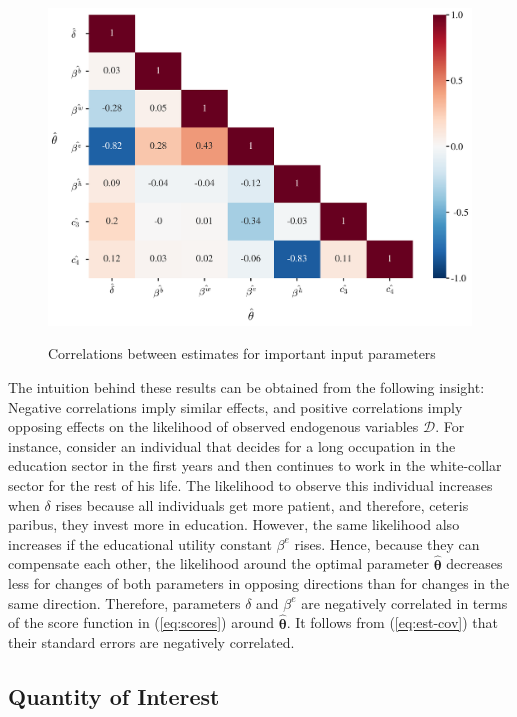 \begin{figure}[H]
	\caption{Correlations between estimates for important input parameters}
	\centering
	\includegraphics[scale=0.45]{../scrypy/figures/heatmap}
	\label{fig:corr}
\end{figure}
\noindent
The intuition behind these results can be obtained from the following insight: Negative correlations imply similar effects, and positive correlations imply opposing effects on the likelihood of observed endogenous variables $\pmb{\mathcal{D}}$. For instance, consider an individual that decides for a long occupation in the education sector in the first years and then continues to work in the white-collar sector for the rest of his life. The likelihood to observe this individual increases when $\delta$ rises because all individuals get more patient, and therefore, ceteris paribus, they invest more in education. However, the same likelihood also increases if the educational utility constant $\beta^e$ rises. Hence, because they can compensate each other, the likelihood around the optimal parameter $\pmb{\hat{\theta}}$ decreases less for changes of both parameters in opposing directions than for changes in the same direction. Therefore, parameters $\delta$ and $\beta^e$ are negatively correlated in terms of the score function in (\ref{eq:scores}) around $\pmb{\hat{\theta}}$. It follows from (\ref{eq:est-cov}) that their standard errors are negatively correlated.


\subsection{Quantity of Interest}

